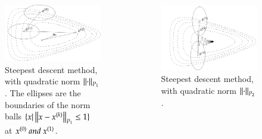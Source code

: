 \begin{frame}
{\begin{columns}
  \begin{column}{0.5\textwidth}
    \begin{figure}[t]
      \includegraphics[scale=0.15]{pics/911.png}
      \caption{\tiny Steepest descent method, with quadratic norm
        $\left\lVert\cdot\right\rVert_{P_1}$. The ellipses are the boundaries of the
        norm balls $\{x | \left\lVert x - x^{(k)}\right\rVert_{P_1} \le 1\}$ at $x^{(0)}
        ~and~ x^{(1)}$.}
    \end{figure}
  \end{column}


  \begin{column}{0.5\textwidth}
    \begin{figure}[t]
      \includegraphics[scale=0.12]{pics/912.png}
      \caption{\tiny Steepest descent method, with quadratic norm
        $\left\lVert\cdot\right\rVert_{P_2}$.}
    \end{figure}
  \end{column}
\end{columns}
}


\end{frame}

